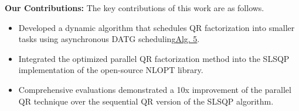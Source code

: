 



\noindent \textbf{Our Contributions:} The key contributions of this work are as follows.
\begin{itemize}
	\item  Developed a dynamic algorithm that schedules QR factorization into smaller tasks using asynchronous DATG scheduling\hyperref[alg:thdwork]{Alg. 5}.
	\item Integrated the optimized parallel QR factorization method into the SLSQP implementation of the open-source NLOPT library. 
	\item Comprehensive evaluations demonstrated a 10x improvement of the parallel QR technique over the sequential QR version of the SLSQP algorithm. %
\end{itemize}
